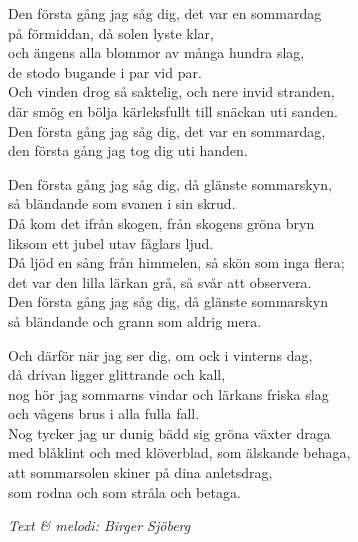 \vspace{10pt}
Den första gång jag såg dig, det var en sommardag\\
på förmiddan, då solen lyste klar,\\
och ängens alla blommor av många hundra slag,\\
de stodo bugande i par vid par.\\
Och vinden drog så saktelig, och nere invid stranden,\\
där smög en bölja kärleksfullt till snäckan uti sanden.\\
Den första gång jag såg dig, det var en sommardag,\\
den första gång jag tog dig uti handen.\par
\vspace{10pt}
Den första gång jag såg dig, då glänste sommarskyn,\\
så bländande som svanen i sin skrud.\\
Då kom det ifrån skogen, från skogens gröna bryn\\
liksom ett jubel utav fåglars ljud.\\
Då ljöd en sång från himmelen, så skön som inga flera;\\
det var den lilla lärkan grå, så svår att observera.\\
Den första gång jag såg dig, då glänste sommarskyn\\
så bländande och grann som aldrig mera.\par
\vspace{10pt}
Och därför när jag ser dig, om ock i vinterns dag,\\
då drivan ligger glittrande och kall,\\
nog hör jag sommarns vindar och lärkans friska slag\\
och vågens brus i alla fulla fall.\\
Nog tycker jag ur dunig bädd sig gröna växter draga\\
med blåklint och med klöverblad, som älskande behaga,\\
att sommarsolen skiner på dina anletsdrag,\\
som rodna och som stråla och betaga.\par
\vspace{10pt}
{\footnotesize\textit{Text \& melodi: Birger Sjöberg}}
